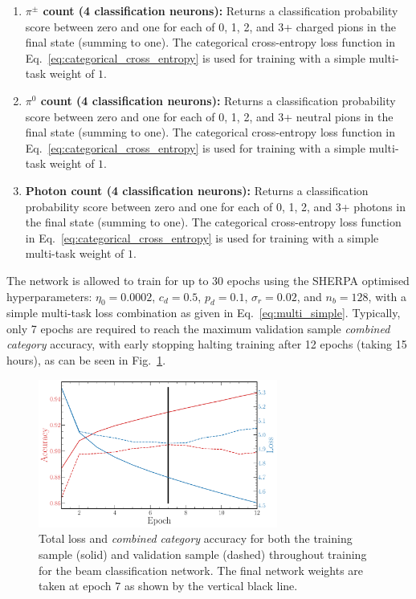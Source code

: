 \begin{enumerate}
          (summing to one). The categorical cross-entropy loss function in
          Eq.~\ref{eq:categorical_cross_entropy} is used for training with a simple multi-task
          weight of $1$.
    \item \textbf{$\pi^{\pm}$ count (4 classification neurons):} Returns a classification
          probability score between zero and one for each of 0, 1, 2, and 3+ charged pions in the
          final state (summing to one). The categorical cross-entropy loss function in
          Eq.~\ref{eq:categorical_cross_entropy} is used for training with a simple multi-task
          weight of $1$.
    \item \textbf{$\pi^{0}$ count (4 classification neurons):} Returns a classification
          probability score between zero and one for each of 0, 1, 2, and 3+ neutral pions in the
          final state (summing to one). The categorical cross-entropy loss function in
          Eq.~\ref{eq:categorical_cross_entropy} is used for training with a simple multi-task
          weight of $1$.
    \item \textbf{Photon count (4 classification neurons):} Returns a classification probability
          score between zero and one for each of 0, 1, 2, and 3+ photons in the final state
          (summing to one). The categorical cross-entropy loss function in
          Eq.~\ref{eq:categorical_cross_entropy} is used for training with a simple multi-task
          weight of $1$.
\end{enumerate}

The network is allowed to train for up to 30 epochs using the SHERPA optimised hyperparameters:
$\eta_{0}=0.0002$, $c_{d}=0.5$, $p_{d}=0.1$, $\sigma_{r}=0.02$, and $n_{b}=128$, with a simple
multi-task loss combination as given in Eq.~\ref{eq:multi_simple}. Typically, only 7 epochs are
required to reach the maximum validation sample \emph{combined category} accuracy, with early
stopping halting training after 12 epochs (taking 15 hours), as can be seen in
Fig.~\ref{fig:final_beam_history}.

\begin{figure} %
    \includegraphics[width=0.7\textwidth]{diagrams/7-results/final_beam_history.pdf}
    \caption[Loss and accuracy throughout training for the cosmic rejection network]
    {Total loss and \emph{combined category} accuracy for both the training sample (solid) and
        validation sample (dashed) throughout training for the beam classification network. The
        final network weights are taken at epoch 7 as shown by the vertical black line.}
    \label{fig:final_beam_history}
\end{figure}

